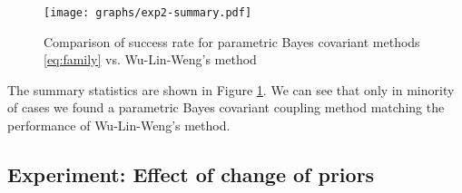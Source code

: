 \begin{figure}[!ht]
\texttt{[image: graphs/exp2-summary.pdf]}
\caption{Comparison of success rate for parametric Bayes covariant methods \eqref{eq:family} vs. Wu-Lin-Weng's method}
\label{fig:par-bc}
\end{figure}

The summary statistics are shown in Figure \ref{fig:par-bc}.
We can see that only in minority of cases we found a parametric Bayes covariant coupling method matching the performance of Wu-Lin-Weng's method. 

%
%
%
%
%
%
%
%

\subsection{Experiment: Effect of change of priors}  \label{sec:exp3}



